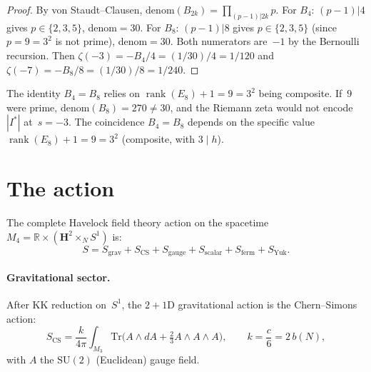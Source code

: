 \begin{proof}
By von Staudt--Clausen, $\mathrm{denom}(B_{2k}) = \prod_{(p-1)|2k} p$.
For $B_4$: $(p{-}1)|4$ gives $p \in \{2,3,5\}$, denom${}= 30$.
For $B_8$: $(p{-}1)|8$ gives $p \in \{2,3,5\}$
(since $p = 9 = 3^2$ is not prime), denom${}= 30$.
Both numerators are~$-1$ by the Bernoulli recursion.
Then $\zeta(-3) = -B_4/4 = (1/30)/4 = 1/120$
and $\zeta(-7) = -B_8/8 = (1/30)/8 = 1/240$.
\end{proof}

\begin{remark}
The identity $B_4 = B_8$ relies on $\operatorname{rank}(E_8) + 1 = 9 = 3^2$
being composite.  If~$9$ were prime, $\mathrm{denom}(B_8) = 270 \neq 30$,
and the Riemann zeta would not encode~$|I^*|$ at~$s = -3$.
The coincidence $B_4 = B_8$ depends on the specific value
$\operatorname{rank}(E_8) + 1 = 9 = 3^2$ (composite, with $3 \mid h$).
\end{remark}


\section{The action}
\label{sec:action}

The complete Havelock field theory action on the spacetime
$M_4 = \mathbb{R} \times (\mathbf{H}^2 \times_N S^1)$ is:
\begin{equation}\label{eq:action}
  S = S_{\mathrm{grav}} + S_{\mathrm{CS}} + S_{\mathrm{gauge}}
    + S_{\mathrm{scalar}} + S_{\mathrm{ferm}} + S_{\mathrm{Yuk}}.
\end{equation}

\paragraph{Gravitational sector.}
After KK reduction on~$S^1$, the $2{+}1$D gravitational action
is the Chern--Simons action:
\begin{equation}\label{eq:S-CS}
  S_{\mathrm{CS}} = \frac{k}{4\pi} \int_{M_3}
  \mathrm{Tr}\!\bigl(A \wedge dA + \tfrac{2}{3} A \wedge A \wedge A\bigr),
  \qquad k = \frac{c}{6} = 2\,b(N),
\end{equation}
with $A$ the $\mathrm{SU}(2)$ (Euclidean) gauge field.

